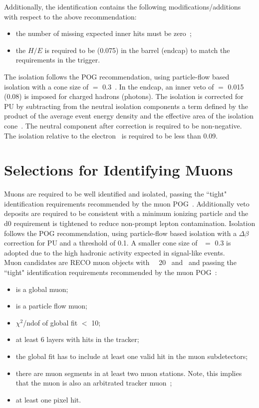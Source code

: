Additionally, the identification contains the following modifications/additions with respect to the above recommendation:

\begin{itemize}
\item the number of missing expected inner hits must be zero~\cite{conv};

\item the $H/E$ is required to be  (0.075) in the barrel (endcap) to match the requirements in the trigger.
\end{itemize}

The isolation follows the POG recommendation, using particle-flow based isolation with a cone size of \DR  $=$ 0.3~\cite{egammapfisotwiki}.  
In the endcap, an inner veto of \DR $=$ 0.015 (0.08) is imposed for charged hadrons (photons). 
The isolation is corrected for PU by subtracting from the neutral isolation components a term defined by the product of the average event energy density and the effective area of the isolation cone~\cite{egammaisorhoaeff}.  The neutral component after correction is required to be non-negative.  
The isolation relative to the electron \pt\ is required to be less than 0.09.



\section{Selections for Identifying Muons}
\label{sec:MuonSelections}
Muons are required to be well identified and isolated, passing the ``tight" identification requirements recommended by the muon POG~\cite{muICHEP2012twiki}. Additionally veto deposits are required to be consistent with a minimum ionizing particle and the d0 requirement is tightened to reduce non-prompt lepton contamination.  
Isolation follows the POG recommendation, using  particle-flow based isolation with a $\Delta\beta$ correction for PU and a threshold of 0.1.
A smaller cone size of \DR\ $=$ 0.3 is adopted due to the high hadronic activity expected in signal-like events.\\

Muon candidates are RECO muon objects with \pt\ \gt\ 20 \GeV\ and \absetamu\ and passing the ``tight" identification requirements recommended by the muon POG~\cite{muICHEP2012twiki}:
\begin{itemize}
\item is a global muon;
\item is a particle flow muon;
\item $\chi^2$/ndof of global fit $<$ 10;
\item at least 6 layers with hits in the tracker;
\item the global fit has to include at least one valid hit in the muon subdetectors;
\item there are muon segments in at least two muon stations. Note, this implies that the muon is also an arbitrated tracker muon~\cite{swguidetrackermuonstwiki};
\item at least one pixel hit.
\end{itemize}

